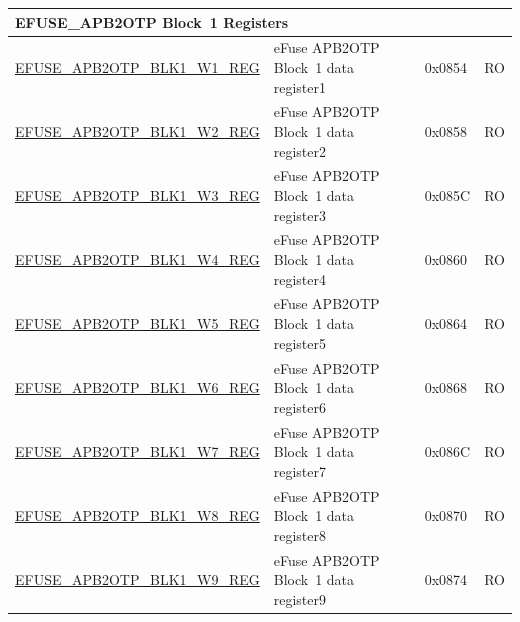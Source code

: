 \begin{longtable}{ | p{7cm} | p{6cm} | p{1.2cm} | p{1.5cm} | }
\multicolumn{4}{|l|}{\textbf{EFUSE\_APB2OTP Block~1 Registers}} \\ \hline
\hyperref[regdesc:EFUSEAPB2OTPBLK1WNREG]{EFUSE\_APB2OTP\_BLK1\_W1\_REG} & eFuse APB2OTP Block~1 data register1 & 0x0854 & RO \\\hline
\hyperref[regdesc:EFUSEAPB2OTPBLK1WNREG]{EFUSE\_APB2OTP\_BLK1\_W2\_REG} & eFuse APB2OTP Block~1 data register2 & 0x0858 & RO \\\hline
\hyperref[regdesc:EFUSEAPB2OTPBLK1WNREG]{EFUSE\_APB2OTP\_BLK1\_W3\_REG} & eFuse APB2OTP Block~1 data register3 & 0x085C & RO \\\hline
\hyperref[regdesc:EFUSEAPB2OTPBLK1WNREG]{EFUSE\_APB2OTP\_BLK1\_W4\_REG} & eFuse APB2OTP Block~1 data register4 & 0x0860 & RO \\\hline
\hyperref[regdesc:EFUSEAPB2OTPBLK1WNREG]{EFUSE\_APB2OTP\_BLK1\_W5\_REG} & eFuse APB2OTP Block~1 data register5 & 0x0864 & RO \\\hline
\hyperref[regdesc:EFUSEAPB2OTPBLK1WNREG]{EFUSE\_APB2OTP\_BLK1\_W6\_REG} & eFuse APB2OTP Block~1 data register6 & 0x0868 & RO \\\hline
\hyperref[regdesc:EFUSEAPB2OTPBLK1WNREG]{EFUSE\_APB2OTP\_BLK1\_W7\_REG} & eFuse APB2OTP Block~1 data register7 & 0x086C & RO \\\hline
\hyperref[regdesc:EFUSEAPB2OTPBLK1WNREG]{EFUSE\_APB2OTP\_BLK1\_W8\_REG} & eFuse APB2OTP Block~1 data register8 & 0x0870 & RO \\\hline
\hyperref[regdesc:EFUSEAPB2OTPBLK1WNREG]{EFUSE\_APB2OTP\_BLK1\_W9\_REG} & eFuse APB2OTP Block~1 data register9 & 0x0874 & RO \\\hline


\end{longtable}
